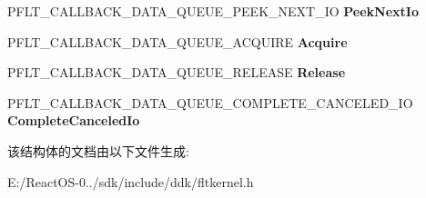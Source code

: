 \begin{DoxyCompactItemize}
\item 
\mbox{\label{struct___f_l_t___c_a_l_l_b_a_c_k___d_a_t_a___q_u_e_u_e_a7d8c67104c3354a340ca205eed0db4da}} 
P\+F\+L\+T\+\_\+\+C\+A\+L\+L\+B\+A\+C\+K\+\_\+\+D\+A\+T\+A\+\_\+\+Q\+U\+E\+U\+E\+\_\+\+P\+E\+E\+K\+\_\+\+N\+E\+X\+T\+\_\+\+IO {\bfseries Peek\+Next\+Io}
\item 
\mbox{\label{struct___f_l_t___c_a_l_l_b_a_c_k___d_a_t_a___q_u_e_u_e_ab02f38ae6da47b5b15940c1d3eb81b54}} 
P\+F\+L\+T\+\_\+\+C\+A\+L\+L\+B\+A\+C\+K\+\_\+\+D\+A\+T\+A\+\_\+\+Q\+U\+E\+U\+E\+\_\+\+A\+C\+Q\+U\+I\+RE {\bfseries Acquire}
\item 
\mbox{\label{struct___f_l_t___c_a_l_l_b_a_c_k___d_a_t_a___q_u_e_u_e_adc8ec4f624ebe05893c117e969e3155c}} 
P\+F\+L\+T\+\_\+\+C\+A\+L\+L\+B\+A\+C\+K\+\_\+\+D\+A\+T\+A\+\_\+\+Q\+U\+E\+U\+E\+\_\+\+R\+E\+L\+E\+A\+SE {\bfseries Release}
\item 
\mbox{\label{struct___f_l_t___c_a_l_l_b_a_c_k___d_a_t_a___q_u_e_u_e_a4107d55ed39a889ce7eda027003a785e}} 
P\+F\+L\+T\+\_\+\+C\+A\+L\+L\+B\+A\+C\+K\+\_\+\+D\+A\+T\+A\+\_\+\+Q\+U\+E\+U\+E\+\_\+\+C\+O\+M\+P\+L\+E\+T\+E\+\_\+\+C\+A\+N\+C\+E\+L\+E\+D\+\_\+\+IO {\bfseries Complete\+Canceled\+Io}
\end{DoxyCompactItemize}


该结构体的文档由以下文件生成\+:\begin{DoxyCompactItemize}
\item 
E\+:/\+React\+O\+S-\/0../sdk/include/ddk/fltkernel.\+h\end{DoxyCompactItemize}
